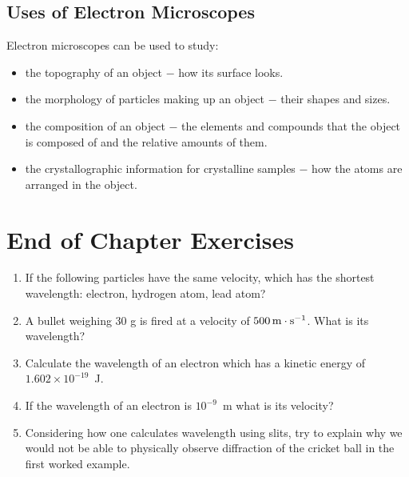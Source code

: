 \subsection{Uses of Electron Microscopes}
Electron microscopes can be used to study:
\begin{itemize}
\item the topography of an object $-$ how its surface looks.
\item the morphology of particles making up an object  $-$ their shapes and sizes.
\item the composition of an object $-$ the elements and compounds that the object is composed of and the relative amounts of them.
\item the crystallographic information for crystalline samples $-$ how the atoms are arranged in the object.
\end{itemize}


\section{End of Chapter Exercises}
\begin{enumerate}
  \item If the following particles have the same velocity, which has the shortest wavelength: electron, hydrogen atom, lead atom? 
\item A bullet weighing 30 g is fired at a velocity of $500\,\mathrm{m \cdot s^{-1}}$. What is its wavelength?
\item Calculate the wavelength of an electron which has a kinetic energy of $1.602\times10^{-19}$~J.
\item If the wavelength of an electron is $10^{-9}$~m what is its velocity?
\item Considering how one calculates wavelength using slits, try to explain why we would not be able to physically observe diffraction of the cricket ball in the first worked example.
 \end{enumerate}






